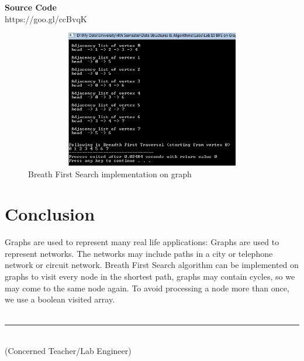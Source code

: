 \documentclass[11pt]{article}            %
\newcommand\tab[1][1cm]{\hspace*{#1}}
\begin{document}
\textbf{Source Code} \\
https://goo.gl/ccBvqK

\begin{figure}[b!]
\centering
  \includegraphics[width=12cm,height=6cm,keepaspectratio]{1.png}
\caption{Breath First Search implementation on graph}
\label{Figure:1}    
\end{figure}

\section{Conclusion}
\justify Graphs are used to represent many real life applications: Graphs are used to represent networks. The networks may include paths in a city or telephone network or circuit network. Breath First Search algorithm can be implemented on graphs to visit every node in the shortest path, graphs may contain cycles, so we may come to the same node again. To avoid processing a node more than once, we use a boolean visited array.\\~\\

\tab[6cm] \noindent\rule{6cm}{0.4pt}\\
\tab[6cm] (Concerned Teacher/Lab Engineer)


 
\end{document}
